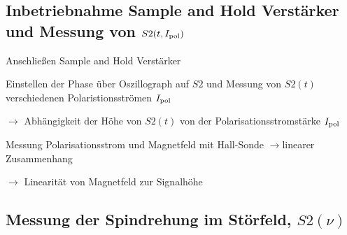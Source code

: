 \documentclass[paper=a4,
	fontsize=10pt,
	DIV=18,
	twocolumn,
	parskip=half
	]{scrartcl}
\numberwithin{equation}{section}    %
\newcommand{\tra}{$\rightarrow $}
\begin{document}
\subsection{Inbetriebnahme Sample and Hold Verstärker und Messung von $S2(t,I_{\rm pol})$}
\label{vorbereitung4}

\begin{compactitem}
	\item Anschließen Sample and Hold Verstärker
	\item Einstellen der Phase über Oszillograph auf $S2$ und Messung von $S2(t)$ verschiedenen Polaristionsströmen $I_{\rm pol}$
	\item[\tra] Abhängigkeit der Höhe von $S2(t)$ von der Polarisationsstromstärke $I_{\rm pol}$
	\item Messung Polarisationsstrom und Magnetfeld mit Hall-Sonde \tra linearer Zusammenhang
	\item[\tra] Linearität von Magnetfeld zur Signalhöhe
\end{compactitem}
\subsection{Messung der Spindrehung im Störfeld, $S2(\nu)$}
\label{vorbereitung5}
\end{document}
